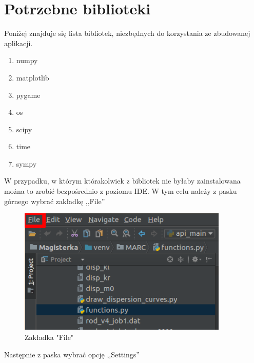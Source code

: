 \section{Potrzebne biblioteki}

Poniżej znajduje się lista bibliotek, niezbędnych do korzystania ze zbudowanej aplikacji.

\begin{enumerate}
\item numpy
\item matplotlib
\item pygame
\item os
\item scipy
\item time
\item sympy
\end{enumerate}

W przypadku, w którym którakolwiek z bibliotek nie byłaby zainstalowana można to zrobić bezpośrednio z poziomu IDE. W tym celu należy z pasku górnego wybrać zakładkę ,,File''

\begin{figure}[h]
\centering
\includegraphics[width=10cm]{Zdjecia/5/kasia/file2}
\caption{Zakładka "File"}
\label{fig:file}
\end{figure}

Następnie z paska wybrać opcję ,,Settings''


